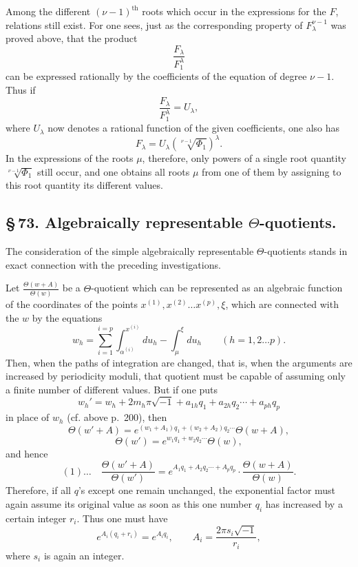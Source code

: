\documentclass[10pt]{article}
\begin{document}
Among the different \((\nu-1)^{\text{th}}\) roots which occur in the expressions for the \(F\), relations still exist. For one sees, just as the corresponding property of \(F_\lambda^{\nu-1}\) was proved above, that the product
\[
\frac{F_\lambda}{F_1^\lambda}
\]
can be expressed rationally by the coefficients of the equation of degree \(\nu-1\). Thus if
\[
\frac{F_\lambda}{F_1^\lambda}=U_\lambda,
\]
where \(U_\lambda\) now denotes a rational function of the given coefficients, one also has
\[
F_\lambda=U_\lambda\left(\sqrt[\nu-1]{\Phi_1}\right)^\lambda.
\]
In the expressions of the roots \(\mu\), therefore, only powers of a single root quantity \(\sqrt[\nu-1]{\Phi_1}\) still occur, and one obtains all roots \(\mu\) from one of them by assigning to this root quantity its different values.

\subsection*{\S\,73. Algebraically representable \(\Theta\)-quotients.}

The consideration of the simple algebraically representable \(\Theta\)-quotients stands in exact connection with the preceding investigations.




Let \(\frac{\Theta(w+A)}{\Theta(w)}\) be a \(\Theta\)-quotient which can be represented as an algebraic function of the coordinates of the points \(x^{(1)},x^{(2)}\ldots x^{(p)},\xi\), which are connected with the \(w\) by the equations
\[
w_h=\sum_{i=1}^{i=p}\int_{\alpha^{(i)}}^{x^{(i)}}du_h-\int_{\mu}^{\xi}du_h
\qquad(h=1,2\ldots p).
\]
Then, when the paths of integration are changed, that is, when the arguments are increased by periodicity moduli, that quotient must be capable of assuming only a finite number of different values. But if one puts
\[
w_h'=w_h+2m_h\pi\sqrt{-1}+a_{1h}q_1+a_{2h}q_2\cdots+a_{ph}q_p
\]
in place of \(w_h\) (cf. above p.~200), then
\[
\Theta(w'+A)=e^{(w_1+A_1)q_1+(w_2+A_2)q_2\cdots}\Theta(w+A),
\]
\[
\Theta(w')=e^{w_1q_1+w_2q_2\cdots}\Theta(w),
\]
and hence
\[
(1)\ldots\quad
\frac{\Theta(w'+A)}{\Theta(w')}
=
e^{A_1q_1+A_2q_2\cdots+A_pq_p}\cdot
\frac{\Theta(w+A)}{\Theta(w)}.
\]
Therefore, if all \(q\)'s except one remain unchanged, the exponential factor must again assume its original value as soon as this one number \(q_i\) has increased by a certain integer \(r_i\). Thus one must have
\[
e^{A_i(q_i+r_i)}=e^{A_iq_i},\qquad
A_i=\frac{2\pi s_i\sqrt{-1}}{r_i},
\]
where \(s_i\) is again an integer.
\end{document}
